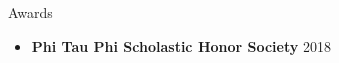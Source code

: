 \documentclass[]{mcdowellcv}
\begin{document}
\begin{cvsection}{Awards}
	\begin{cvsubsection}{}{}{}
		\begin{itemize}
			\setlength\itemsep{3pt}
			\item \textbf{Phi Tau Phi Scholastic Honor Society}  2018
		\end{itemize}
	\end{cvsubsection}
\end{cvsection}
\ 
\end{document}

